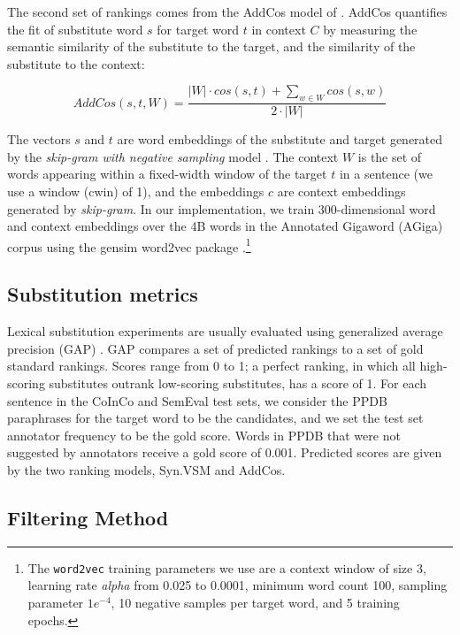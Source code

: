 \documentclass[11pt]{article}
\begin{document}
	The second set of rankings comes from the AddCos model of . AddCos quantifies the fit of substitute word $s$ for target word $t$ in context $C$ by measuring the semantic similarity of the substitute to the target, and the similarity of the substitute to the context:
	
	\begin{dmath}
		AddCos(s,t,W) = \frac{|W| \cdot cos(s,t) + \sum_{w \in W} cos(s,w)}{2 \cdot |W|}
	\end{dmath}
	
	\noindent The vectors $s$ and $t$ are word embeddings of the substitute and target generated by the \textit{skip-gram with negative sampling} model \cite{mikolov2013distributed,mikolov2013efficient}. The context $W$ is the set of words appearing within a fixed-width window of the target $t$ in a sentence (we use a window (cwin) of 1), and the embeddings $c$ are context embeddings generated by \textit{skip-gram}. In our implementation, we train 300-dimensional word and context embeddings over the 4B words in the Annotated Gigaword (AGiga) corpus \cite{napoles2012annotated} using the gensim word2vec package \cite{mikolov2013distributed,mikolov2013efficient,ismu:884893}.\footnote{The \texttt{word2vec} training parameters we use are a context window of size 3, learning rate \textit{alpha} from 0.025 to 0.0001, minimum word count 100, sampling parameter $1e^{-4}$, 10 negative samples per target word, and 5 training epochs.}
	
	\subsection{Substitution metrics}
	
	Lexical substitution experiments are usually evaluated using generalized average precision (GAP) \cite{kishida2005property}. GAP compares a set of predicted rankings to a set of gold standard rankings. Scores range from 0 to 1; a perfect ranking, in which all high-scoring substitutes outrank low-scoring substitutes, has a score of 1. For each sentence in the CoInCo and SemEval test sets, we consider the PPDB paraphrases for the target word to be the candidates, and we set the test set annotator frequency to be the gold score. Words in PPDB that were not suggested by annotators receive a gold score of 0.001. Predicted scores are given by the two ranking models, Syn.VSM and AddCos.
	
	\subsection{Filtering Method}
	
\end{document}
